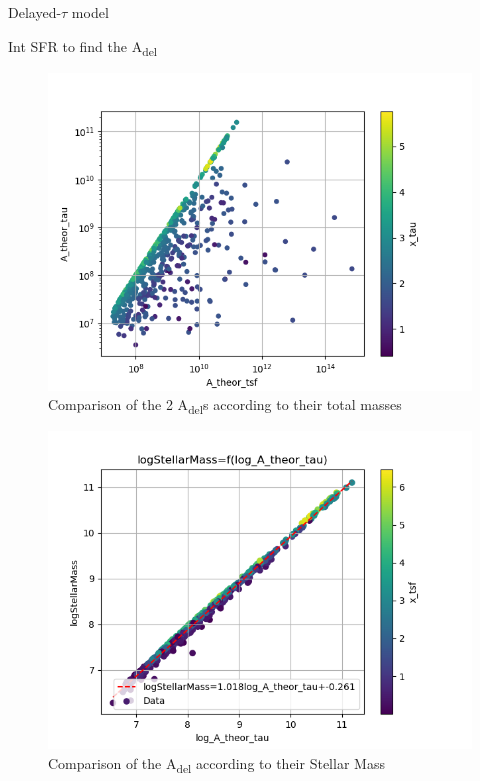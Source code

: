 \documentclass[presentation]{beamer}
\begin{document}
\begin{frame}[label={sec:org05089e9}]{Delayed-\(\tau\) model}
\begin{block}{Int SFR to find the A\textsubscript{del}}
\begin{figure}[!htpb]
\centering
\includegraphics[width=.9\linewidth]{./figs/A_theor_tau-M*.png}
\caption{\label{fig:Comparison of the 2 A_{del}s according to their total masses}Comparison of the 2 A\textsubscript{del}s according to their total masses}
\end{figure}


\begin{figure}[!htpb]
\centering
\includegraphics[width=.9\linewidth]{./figs/log_A_theor_tau-logStellarMass-color_x_tsf.png}
\caption{\label{fig:Comparison of the A_del according to their Stellar Mass}Comparison of the A\textsubscript{del} according to their Stellar Mass}
\end{figure}
\end{block}
\end{frame}
\end{document}

